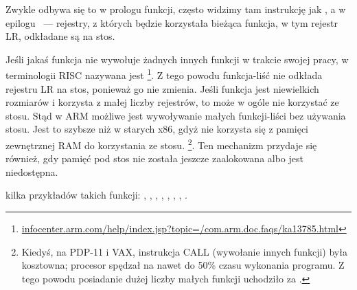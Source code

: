 
Zwykle odbywa się to w prologu funkcji, często widzimy tam instrukcję jak , a w epilogu
~--- rejestry, z których będzie korzystała bieżąca funkcja, w tym rejestr \ac{LR}, odkładane są na stos.

Jeśli jakaś funkcja nie wywołuje żadnych innych funkcji w trakcie swojej pracy, w terminologii \ac{RISC} nazywana jest
\emph{}\footnote{\href{http://infocenter.arm.com/help/index.jsp?topic=/com.arm.doc.faqs/ka13785.html}{infocenter.arm.com/help/index.jsp?topic=/com.arm.doc.faqs/ka13785.html}}.
Z tego powodu funkcja-liść nie odkłada rejestru \ac{LR} na stos, ponieważ go nie zmienia.
Jeśli funkcja jest niewielkich rozmiarów i korzysta z małej liczby rejestrów, to może w ogóle nie korzystać ze stosu.
Stąd w ARM możliwe jest wywoływanie małych funkcji-liści bez używania stosu.
Jest to szybsze niż w starych x86, gdyż nie korzysta się z pamięci zewnętrznej RAM do korzystania ze stosu.
\footnote{Kiedyś, na PDP-11 i VAX, instrukcja CALL (wywołanie innych funkcji) była kosztowna; procesor spędzał na \CALL nawet do 50\% czasu wykonania programu. Z tego powodu posiadanie dużej liczby małych funkcji uchodziło za 
.}.
Ten mechanizm przydaje się również, gdy pamięć pod stos nie została jeszcze zaalokowana albo jest niedostępna.

kilka przykładów takich funkcji:
, , 
, , ,
, , .


